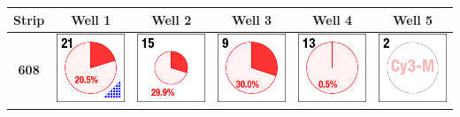 \begin{table}
\begin{center}
\begin{tabular}{cccccc}
Strip & Well 1 & Well 2 & Well 3 & Well 4 & Well 5\\
\hline
\textbf{608} & \includegraphics{./images/ace_m2_sample_tiles/sample21.png} & \includegraphics{./images/ace_m2_sample_tiles/sample15.png} & \includegraphics{./images/ace_m2_sample_tiles/sample09.png} & \includegraphics{./images/ace_m2_sample_tiles/sample13.png} & \includegraphics{./images/ace_m2_sample_tiles/sample02.png}\\

\end{tabular}
\end{center}
\end{table}
